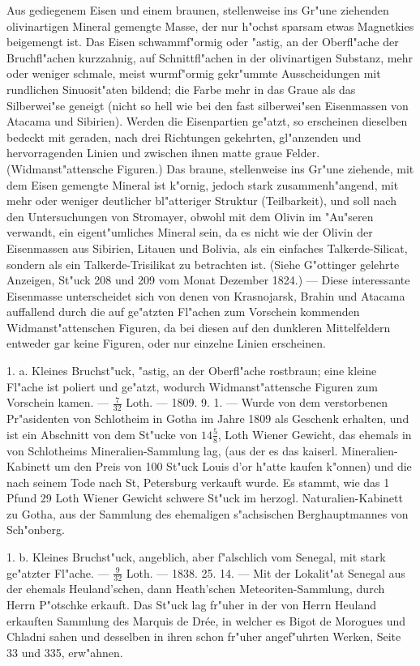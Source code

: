 \documentclass[a4paper, 11pt, oneside, polutonikogreek, german]{article}
\begin{document}
Aus gediegenem Eisen und einem braunen, stellenweise ins Gr"une ziehenden olivinartigen Mineral gemengte Masse, der nur h"ochst sparsam etwas Magnetkies beigemengt ist. Das Eisen schwammf"ormig oder "astig, an der Oberfl"ache der Bruchfl"achen kurzzahnig, auf Schnittfl"achen in der olivinartigen Substanz, mehr oder weniger schmale, meist wurmf"ormig gekr"ummte Ausscheidungen mit rundlichen Sinuosit"aten bildend; die Farbe mehr in das Graue als das Silberwei"se geneigt (nicht so hell wie bei den fast silberwei"sen Eisenmassen von Atacama und Sibirien). Werden die Eisenpartien ge"atzt, so erscheinen dieselben bedeckt mit geraden, nach drei Richtungen gekehrten, gl"anzenden und hervorragenden Linien und zwischen ihnen matte graue Felder. (Widmanst"attensche Figuren.) Das braune, stellenweise ins Gr"une ziehende, mit dem Eisen gemengte Mineral ist k"ornig, jedoch stark zusammenh"angend, mit mehr oder weniger deutlicher bl"atteriger Struktur (Teilbarkeit), und soll nach den Untersuchungen von Stromayer, obwohl mit dem Olivin im "Au"seren verwandt, ein eigent"umliches Mineral sein, da es nicht wie der Olivin der Eisenmassen aus Sibirien, Litauen und Bolivia, als ein einfaches Talkerde-Silicat, sondern als ein Talkerde-Trisilikat zu betrachten ist. (Siehe G"ottinger gelehrte Anzeigen, St"uck 208 und 209 vom Monat Dezember 1824.) --- Diese interessante Eisenmasse unterscheidet sich von denen von Krasnojarsk, Brahin und Atacama auffallend durch die auf ge"atzten Fl"achen zum Vorschein kommenden Widmanst"attenschen Figuren, da bei diesen auf den dunkleren Mittelfeldern entweder gar keine Figuren, oder nur einzelne Linien erscheinen.

1. a. Kleines Bruchst"uck, "astig, an der Oberfl"ache rostbraun; eine kleine Fl"ache ist poliert und ge"atzt, wodurch Widmanst"attensche Figuren zum Vorschein kamen. --- $\frac{7}{32}$ Loth. --- 1809. 9. 1. --- Wurde von dem verstorbenen Pr"asidenten von Schlotheim in Gotha im Jahre 1809 als Geschenk erhalten, und ist ein Abschnitt von dem St"ucke von $14\frac{5}{8}$, Loth Wiener Gewicht, das ehemals in von Schlotheims Mineralien-Sammlung lag, (aus der es das kaiserl. Mineralien-Kabinett um den Preis von 100 St"uck Louis d'or h"atte kaufen k"onnen) und die nach seinem Tode nach St, Petersburg verkauft wurde. Es stammt, wie das 1 Pfund 29 Loth Wiener Gewicht schwere St"uck im herzogl. Naturalien-Kabinett zu Gotha, aus der Sammlung des ehemaligen s"achsischen Berghauptmannes von Sch"onberg.

1. b. Kleines Bruchst"uck, angeblich, aber f"alschlich vom Senegal, mit stark ge"atzter Fl"ache. --- $\frac{9}{32}$ Loth. --- 1838. 25. 14. --- Mit der Lokalit"at Senegal aus der ehemals Heuland'schen, dann Heath'schen Meteoriten-Sammlung, durch Herrn P"otschke erkauft. Das St"uck lag fr"uher in der von Herrn Heuland erkauften Sammlung des Marquis de Drée, in welcher es Bigot de Morogues und Chladni sahen und desselben in ihren schon fr"uher angef"uhrten Werken, Seite 33 und 335, erw"ahnen.
\end{document}
